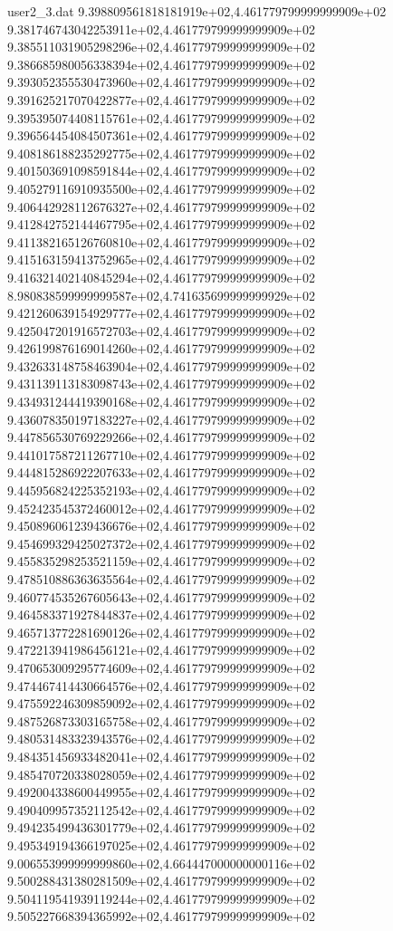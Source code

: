 \begin{filecontents}{user2_3.dat}
9.398809561818181919e+02,4.461779799999999909e+02
9.381746743042253911e+02,4.461779799999999909e+02
9.385511031905298296e+02,4.461779799999999909e+02
9.386685980056338394e+02,4.461779799999999909e+02
9.393052355530473960e+02,4.461779799999999909e+02
9.391625217070422877e+02,4.461779799999999909e+02
9.395395074408115761e+02,4.461779799999999909e+02
9.396564454084507361e+02,4.461779799999999909e+02
9.408186188235292775e+02,4.461779799999999909e+02
9.401503691098591844e+02,4.461779799999999909e+02
9.405279116910935500e+02,4.461779799999999909e+02
9.406442928112676327e+02,4.461779799999999909e+02
9.412842752144467795e+02,4.461779799999999909e+02
9.411382165126760810e+02,4.461779799999999909e+02
9.415163159413752965e+02,4.461779799999999909e+02
9.416321402140845294e+02,4.461779799999999909e+02
8.980838599999999587e+02,4.741635699999999929e+02
9.421260639154929777e+02,4.461779799999999909e+02
9.425047201916572703e+02,4.461779799999999909e+02
9.426199876169014260e+02,4.461779799999999909e+02
9.432633148758463904e+02,4.461779799999999909e+02
9.431139113183098743e+02,4.461779799999999909e+02
9.434931244419390168e+02,4.461779799999999909e+02
9.436078350197183227e+02,4.461779799999999909e+02
9.447856530769229266e+02,4.461779799999999909e+02
9.441017587211267710e+02,4.461779799999999909e+02
9.444815286922207633e+02,4.461779799999999909e+02
9.445956824225352193e+02,4.461779799999999909e+02
9.452423545372460012e+02,4.461779799999999909e+02
9.450896061239436676e+02,4.461779799999999909e+02
9.454699329425027372e+02,4.461779799999999909e+02
9.455835298253521159e+02,4.461779799999999909e+02
9.478510886363635564e+02,4.461779799999999909e+02
9.460774535267605643e+02,4.461779799999999909e+02
9.464583371927844837e+02,4.461779799999999909e+02
9.465713772281690126e+02,4.461779799999999909e+02
9.472213941986456121e+02,4.461779799999999909e+02
9.470653009295774609e+02,4.461779799999999909e+02
9.474467414430664576e+02,4.461779799999999909e+02
9.475592246309859092e+02,4.461779799999999909e+02
9.487526873303165758e+02,4.461779799999999909e+02
9.480531483323943576e+02,4.461779799999999909e+02
9.484351456933482041e+02,4.461779799999999909e+02
9.485470720338028059e+02,4.461779799999999909e+02
9.492004338600449955e+02,4.461779799999999909e+02
9.490409957352112542e+02,4.461779799999999909e+02
9.494235499436301779e+02,4.461779799999999909e+02
9.495349194366197025e+02,4.461779799999999909e+02
9.006553999999999860e+02,4.664447000000000116e+02
9.500288431380281509e+02,4.461779799999999909e+02
9.504119541939119244e+02,4.461779799999999909e+02
9.505227668394365992e+02,4.461779799999999909e+02

\end{filecontents}
